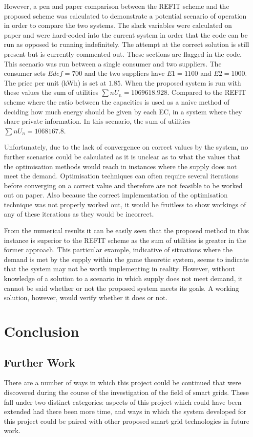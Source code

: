 \documentclass[a4paper, notitlepage]{report}
\begin{document}
However, a pen and paper comparison between the REFIT scheme and the proposed
scheme was calculated to demonstrate a potential scenario of operation in order
to compare the two systems. The slack variables were calculated on paper and
were hard-coded into the current system in order that the code can be run as
opposed to running indefinitely. The attempt at the correct solution is still
present but is currently commented out. These sections are flagged in the code.
This scenario was run between a single consumer and two suppliers. The consumer
sets \(Edef= 700\) and the two suppliers have \(E1 = 1100\) and \(E2 = 1000\). The
price per unit (kWh) is set at \(1.85\). When the proposed system is run with
these values the sum of utilities \(∑n U_n = 1069618.928\). Compared to the REFIT
scheme where the ratio between the capacities is used as a naive method of
deciding how much energy should be given by each EC, in a system where they
share private information. In this scenario, the sum of utilities \(∑n U_n =
1068167.8\).

Unfortunately, due to the lack of convergence on correct values by the system, no
further scenarios could be calculated as it is unclear as to what the values
that the optimisation methods would reach in instances where the supply does not
meet the demand. Optimisation techniques can often require several iterations
before converging on a correct value and therefore are not feasible to be worked
out on paper. Also because the correct implementation of the optimisation
technique was not properly worked out, it would be fruitless to show workings of
any of these iterations as they would be incorrect.

From the numerical results it can be easily seen that the proposed method in
this instance is superior to the REFIT scheme as the sum of utilities is greater
in the former approach. This particular example, indicative of situations where
the demand is met by the supply within the game theoretic system, seems to
indicate that the system may not be worth implementing in reality. However,
without knowledge of a solution to a scenario in which supply does not meet
demand, it cannot be said whether or not the proposed system meets its goals. A working
solution, however, would verify whether it does or not.
\part{Conclusion}
\label{sec:org31976d8}
\chapter{Further Work}
\label{sec:org43089fa}
There are a number of ways in which this project could be continued that were
discovered during the course of the investigation of the field of smart grids.
These fall under two distinct categories: aspects of this project which could
have been extended had there been more time, and ways in which the system
developed for this project could be paired with other proposed smart grid
technologies in future work.
\end{document}
